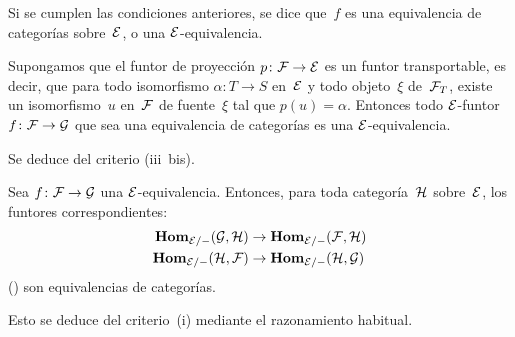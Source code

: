 \begin{definition}
\label{VI.4.3} Si se cumplen las condiciones anteriores, se dice que~$f$ es
una equivalencia de categorías sobre~$\cal{E}$, o una
$\cal{E}$-equivalencia.
\end{definition}

\begin{corollaire}
\label{VI.4.4} Supongamos que el funtor de proyección
$p\colon\cal{F}\to\cal{E}$ es un funtor transportable, es decir, que para
todo isomorfismo $\alpha\colon T\to S$ en~$\cal{E}$ y todo objeto~$\xi$
de~$\cal{F}_T$, existe un isomorfismo~$u$ en~$\cal{F}$ de fuente~$\xi$ tal
que $p(u)=\alpha$. Entonces todo $\cal{E}$-funtor
$f\colon\cal{F}\to\cal{G}$ que sea una equivalencia de categorías es una
$\cal{E}$-equivalencia.
\end{corollaire}

Se deduce
del criterio (iii~bis).

\begin{corollaire}
\label{VI.4.5} Sea $f\colon\cal{F}\to\cal{G}$ una
$\cal{E}$-equivalencia. Entonces, para toda categoría~$\cal{H}$
sobre~$\cal{E}$, los funtores correspondientes:
\begin{align*}
\SheafHom_{\cal{E}/-}(\cal{G},\cal{H})&\to
\SheafHom_{\cal{E}/-}(\cal{F},\cal{H})\\
\SheafHom_{\cal{E}/-}(\cal{H},\cal{F})
&\to\SheafHom_{\cal{E}/-}(\cal{H},\cal{G})
\end{align*}
(\cf \No {}) son equivalencias de categorías.
\end{corollaire}

Esto se deduce del criterio~(i) mediante el razonamiento habitual.
